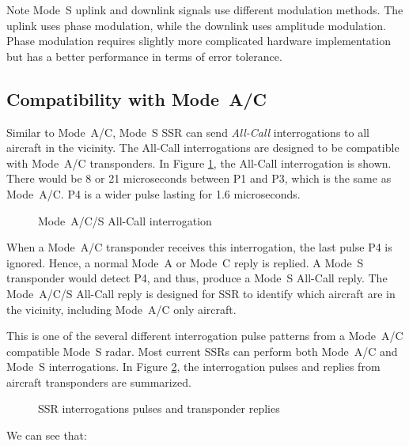 \begin{notebox}{Note}
  Mode~S uplink and downlink signals use different modulation methods. The uplink uses phase modulation, while the downlink uses amplitude modulation. Phase modulation requires slightly more complicated hardware implementation but has a better performance in terms of error tolerance. 
\end{notebox}

\subsection{Compatibility with Mode~A/C}

Similar to Mode~A/C, Mode~S SSR can send \emph{All-Call} interrogations to all aircraft in the vicinity. The All-Call interrogations are designed to be compatible with Mode~A/C transponders. In Figure \ref{fig:mode_s_all_call}, the All-Call interrogation is shown. There would be 8 or 21 microseconds between P1 and P3, which is the same as Mode~A/C. P4 is a wider pulse lasting for 1.6 microseconds.

\begin{figure}[ht]
  \scalebox{0.9}{
    
  }
  \caption{Mode~A/C/S All-Call interrogation}
  \label{fig:mode_s_all_call}
\end{figure}

When a Mode~A/C transponder receives this interrogation, the last pulse P4 is ignored. Hence, a normal Mode~A or Mode~C reply is replied. A Mode~S transponder would detect P4, and thus, produce a Mode~S All-Call reply. The Mode~A/C/S All-Call reply is designed for SSR to identify which aircraft are in the vicinity, including Mode~A/C only aircraft.

This is one of the several different interrogation pulse patterns from a Mode~A/C compatible Mode~S radar. Most current SSRs can perform both Mode~A/C and Mode~S interrogations. In Figure \ref{fig:mode_s_inter_mode}, the interrogation pulses and replies from aircraft transponders are summarized.

\begin{figure}[ht]
  \scalebox{0.9}{
    
  }
  \caption{SSR interrogations pulses and transponder replies}
  \label{fig:mode_s_inter_mode}
\end{figure}

We can see that:

